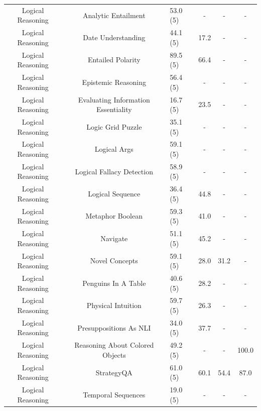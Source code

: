 \documentclass[11pt, a4paper, logo, internal, copyright, nonumbering]{deepmind}
\begin{document}
\begin{center}
\begin{longtable}{cclccc}
      Logical Reasoning &                   Analytic Entailment &   53.0 (5) &   - &   - &          - \\
      Logical Reasoning &                  Date Understanding &   44.1 (5) &  17.2 &   - &          - \\
      Logical Reasoning &                     Entailed Polarity &   89.5 (5) &  66.4 &   - &          - \\
      Logical Reasoning &                   Epistemic Reasoning &   56.4 (5) &   - &   - &          - \\
      Logical Reasoning &   Evaluating Information Essentiality &   16.7 (5) &  23.5 &   - &          - \\
      Logical Reasoning &                     Logic Grid Puzzle &   35.1 (5) &   - &   - &          - \\
      Logical Reasoning &                          Logical Args &   59.1 (5) &   - &   - &          - \\
      Logical Reasoning &             Logical Fallacy Detection &   58.9 (5) &   - &   - &          - \\
      Logical Reasoning &                      Logical Sequence &   36.4 (5) &  44.8 &   - &          - \\
      Logical Reasoning &                      Metaphor Boolean &   59.3 (5) &  41.0 &   - &          - \\
      Logical Reasoning &                            Navigate &   51.1 (5) &  45.2 &   - &          - \\
      Logical Reasoning &                      Novel Concepts &   59.1 (5) &  28.0 &  31.2 &          - \\
      Logical Reasoning &                 Penguins In A Table &   40.6 (5) &  28.2 &   - &          - \\
      Logical Reasoning &                  Physical Intuition &   59.7 (5) &  26.3 &   - &          - \\
      Logical Reasoning &              Presuppositions As NLI &   34.0 (5) &  37.7 &   - &          - \\
      Logical Reasoning &       Reasoning About Colored Objects &   49.2 (5) &   - &   - &        100.0 \\
      Logical Reasoning &                          StrategyQA &   61.0 (5) &  60.1 &  54.4 &         87.0 \\
      Logical Reasoning &                    Temporal Sequences &   19.0 (5) &   - &   - &          - \\

\end{longtable}
\end{center}
\end{document}
